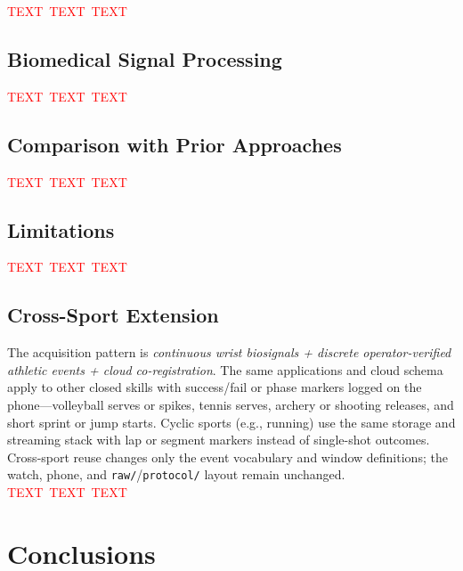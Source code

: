 \documentclass[sensors,article,submit,pdftex,moreauthors]{Definitions/mdpi}
\newcommand{\ph}{\textcolor{red}{TEXT}}
\newcommand{\phh}{\ph{}\ \ph{}\ \ph{}}
\begin{document}
\phh



\subsection{Biomedical Signal Processing}



\phh



\subsection{Comparison with Prior Approaches}



\phh



\subsection{Limitations}



\phh



\subsection{Cross-Sport Extension}



The acquisition pattern is \emph{continuous wrist biosignals + discrete operator-verified athletic events + cloud co-registration}. The same applications and cloud schema apply to other closed skills with success/fail or phase markers logged on the phone---volleyball serves or spikes, tennis serves, archery or shooting releases, and short sprint or jump starts. Cyclic sports (e.g., running) use the same storage and streaming stack with lap or segment markers instead of single-shot outcomes. Cross-sport reuse changes only the event vocabulary and window definitions; the watch, phone, and \texttt{raw/}/\texttt{protocol/} layout remain unchanged. \phh




\section{Conclusions}
\end{document}
